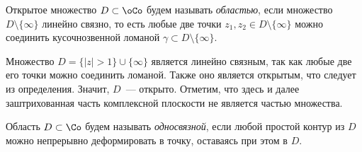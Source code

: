 \begin{definition}
Открытое множество \(D \subset \oCo\) будем называть \textit{областью}, если множество \(D \setminus
\{\infty\}\) линейно связно, то есть любые две точки \(z_1, z_2 \in D \setminus \{\infty\}\) можно
соединить кусочнозвенной ломаной \(\gamma \subset D \setminus \{\infty\}\).
\end{definition}

\newpage
\begin{example}
\hfill \noindent
\par
\begin{minipage}[c]{0.45\textwidth}
    \centering
\end{minipage}
\hfill
\begin{minipage}[c]{0.5\textwidth}
Множество \(D = \{|z| > 1\} \cup \{\infty\}\) является линейно связным, так как любые две его точки
можно соединить ломаной. Также оно является открытым, что следует из определения. Значит, \(D\)~---
открыто. Отметим, что здесь и далее заштрихованная часть комплексной плоскости не является частью
множества.
\end{minipage}
\end{example}

\begin{definition}
Область \(D \subset \Co\) будем называть \textit{односвязной}, если любой простой контур из \(D\)
можно непрерывно деформировать в точку, оставаясь при этом в \(D\).
\end{definition}

